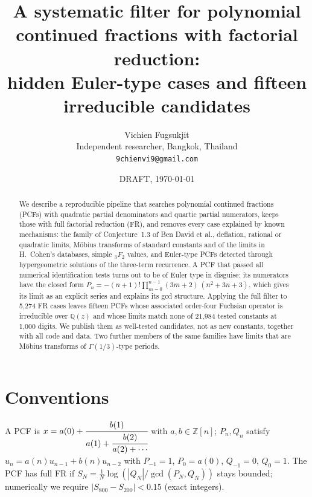 \documentclass[11pt]{article}
\title{A systematic filter for polynomial continued fractions with factorial reduction:\\ hidden Euler-type cases and fifteen irreducible candidates}
\author{Vichien Fugsukjit\\ Independent researcher, Bangkok, Thailand\\ \texttt{9chienvi9@gmail.com}}
\date{DRAFT, \today}
\begin{document}
\maketitle
\begin{abstract}
We describe a reproducible pipeline that searches polynomial continued fractions (PCFs) with quadratic partial denominators and
quartic partial numerators, keeps those with full factorial reduction (FR), and removes every case explained by known mechanisms:
the family of Conjecture~1.3 of Ben David et al., deflation, rational or quadratic limits, M\"obius transforms of standard constants
and of the limits in H.~Cohen's databases, simple ${}_3F_2$ values, and Euler-type PCFs detected through hypergeometric solutions of
the three-term recurrence. A PCF that passed all numerical identification tests turns out to be of Euler type in disguise: its
numerators have the closed form $P_n=-(n+1)!\prod_{m=0}^{n-1}(3m+2)\,(n^2+3n+3)$, which gives its limit as an explicit series and
explains its gcd structure. Applying the full filter to 5,274 FR cases leaves fifteen PCFs whose associated order-four Fuchsian
operator is irreducible over $\mathbb Q(z)$ and whose limits match none of 21,984 tested constants at 1,000 digits. We publish them
as well-tested candidates, not as new constants, together with all code and data. Two further members of the same families have
limits that are M\"obius transforms of $\Gamma(1/3)$-type periods.
\end{abstract}

\section{Conventions}
A PCF is $x=a(0)+\cfrac{b(1)}{a(1)+\cfrac{b(2)}{a(2)+\cdots}}$ with $a,b\in\mathbb Z[n]$; $P_n,Q_n$ satisfy
$u_n=a(n)u_{n-1}+b(n)u_{n-2}$ with $P_{-1}=1$, $P_0=a(0)$, $Q_{-1}=0$, $Q_0=1$. The PCF has full FR if
$S_N=\frac1N\log(|Q_N|/\gcd(P_N,Q_N))$ stays bounded; numerically we require $|S_{800}-S_{200}|<0.15$ (exact integers).
\end{document}
